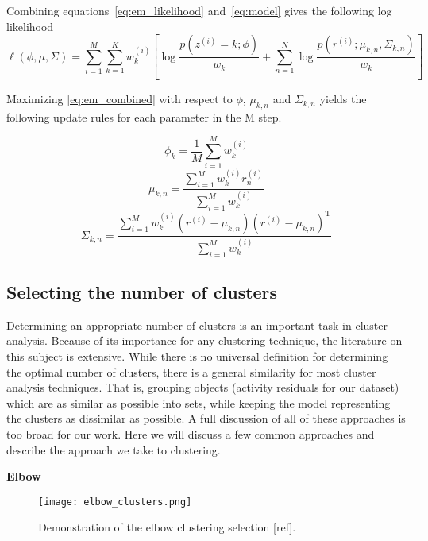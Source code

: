 Combining equations~\ref{eq:em_likelihood} and~\ref{eq:model} gives the following log likelihood
\begin{equation}
\label{eq:em_combined}
\ell(\phi, \mu, \Sigma) = \sum_{i = 1}^{M}\sum_{k = 1}^{K}w_{k}^{(i)} [\log \frac{p(z^{(i)} = k; \phi)}{w_{k}} + \sum_{n = 1}^{N} \log \frac{p(r^{(i)}; \mu_{k, n}, \Sigma_{k, n})}{w_{k}}]
\end{equation}

Maximizing \ref{eq:em_combined} with respect to $\phi$, $\mu_{k, n}$ and $\Sigma_{k, n}$ yields the following update rules for each parameter in the M step.

\begin{equation}
\phi_{k} = \frac{1}{M}\sum_{i = 1}^{M}w_{k}^{(i)}
\end{equation}
\begin{equation}
\mu_{k, n} = \frac{\sum_{i = 1}^{M}w_{k}^{(i)}r^{(i)}_{n}}{\sum_{i = 1}^{M}w_{k}^{(i)}}
\end{equation}
\begin{equation}
\Sigma_{k, n} = \frac{\sum_{i = 1}^{M}w_{k}^{(i)}(r^{(i)} - \mu_{k, n})(r^{(i)} - \mu_{k, n})^{\mathrm{T}}}{\sum_{i = 1}^{M}w_{k}^{(i)}}
\end{equation}


\subsection{Selecting the number of clusters}

Determining an appropriate number of clusters is an important task in cluster analysis.  Because of its importance for any clustering technique, the literature on this subject is extensive.  While there is no universal definition for determining the optimal number of clusters, there is a general similarity for most cluster analysis techniques.  That is, grouping objects (activity residuals for our dataset) which are as similar as possible into sets, while keeping the model representing the clusters as dissimilar as possible.  A full discussion of all of these approaches is too broad for our work.  Here we will discuss a few common approaches and describe the approach we take to clustering.

\bigskip
\noindent
\textbf{Elbow}

\begin{wrapfigure}{R}{0.4\textwidth}
\centering
\texttt{[image: elbow\_clusters.png]}
\caption{Demonstration of the elbow clustering selection [ref].}
\label{fig:elbow_cluster}
\end{wrapfigure}

